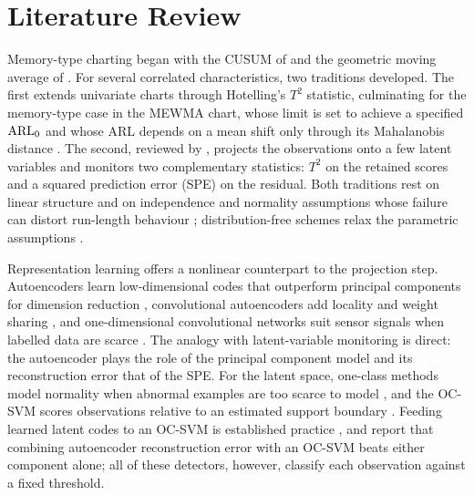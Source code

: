 \section{Literature Review}

Memory-type charting began with the CUSUM of \citet{page_continuous_1954} and the geometric moving
average of \citet{roberts_control_1959}. For several correlated characteristics, two traditions
developed. The first extends univariate charts through Hotelling's $T^2$ statistic, culminating
for the memory-type case in the MEWMA chart, whose limit is set to achieve a specified $\mathrm{ARL}_0$ and
whose ARL depends on a mean shift only through its Mahalanobis distance
\citep{lowry_multivariate_1992}. The second, reviewed by \citet{macgregor_statistical_nodate},
projects the observations onto a few latent variables and monitors two complementary statistics:
$T^2$ on the retained scores and a squared prediction error (SPE) on the residual. Both traditions
rest on linear structure and on independence and normality assumptions whose failure can distort
run-length behaviour \citep{ahmed_statistical_2017}; distribution-free schemes relax the
parametric assumptions \citep{arslan_rankbased_2026}.

Representation learning offers a nonlinear counterpart to the projection step. Autoencoders learn
low-dimensional codes that outperform principal components for dimension reduction
\citep{hinton_reducing_2006}, convolutional autoencoders add locality and weight sharing
\citep{honkela_stacked_2011}, and one-dimensional convolutional networks suit sensor signals when
labelled data are scarce \citep{kiranyaz_1d_2021}. The analogy with latent-variable monitoring is
direct: the autoencoder plays the role of the principal component model and its reconstruction
error that of the SPE. For the latent space, one-class methods model normality when abnormal
examples are too scarce to model \citep{pimentel_review_2014}, and the OC-SVM scores observations
relative to an estimated support boundary \citep{scholkopf_estimating_2001}. Feeding learned
latent codes to an OC-SVM is established practice \citep{alaverdyan_regularized_2020,
pinon_one-class_2023,mabu_disaster_2019}, and \citet{guzman_sidewalk_2026} report that combining
autoencoder reconstruction error with an OC-SVM beats either component alone; all of these detectors,
however, classify each observation against a fixed threshold.

